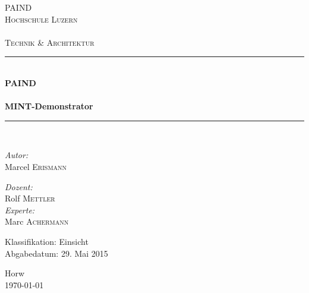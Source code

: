 \begin{titlepage}

\begin{center}

\textsc{\LARGE PAIND}\\[1.5cm]

\textsc{\Large Hochschule Luzern\\
    ~\\
    Technik \& Architektur}\\[0.5cm]

\vfill{}

\newcommand{\HRule}{\rule{\linewidth}{0.5mm}}
\HRule \\[0.4cm]
{   \Huge \bfseries PAIND \\
       ~\\
       \large MINT-Demonstrator}\\[0.4cm]
\HRule \\[1.5cm]

\begin{minipage}{0.4\textwidth}
    \begin{flushleft} \large
        \emph{Autor:}\\
        Marcel \textsc{Erismann}\\

    \end{flushleft}
\end{minipage}
\hfill
\begin{minipage}{0.4\textwidth}
    \begin{flushright} \large
        \emph{Dozent:} \\
        Rolf \textsc{Mettler}\\
        \emph{Experte:} \\
        Marc \textsc{Achermann}
    \end{flushright}
\end{minipage}

\vspace{1.5 cm} 
\begin{center}
Klassifikation: Einsicht\\
Abgabedatum: 29. Mai 2015
\end{center}

\vfill{}
\vfill{}
\vfill{}

{\large Horw\\ \today}

\end{center}

\end{titlepage}
